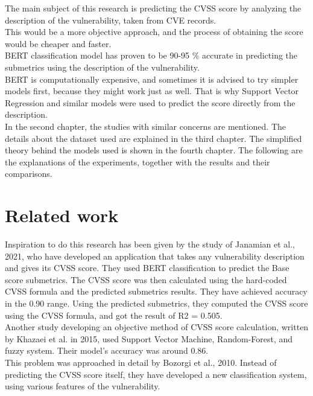 \documentclass[times, utf8, zavrsni, english]{fer}
\begin{document}
\noindent The main subject of this research is predicting the CVSS score by analyzing the description of the vulnerability, taken from CVE records. \\
This would be a more objective approach, and the process of obtaining the score would be cheaper and faster. \\
BERT classification model has proven to be 90-95 \% accurate in predicting the submetrics using the description of the vulnerability. \\
BERT is computationally expensive, and sometimes it is advised to try simpler models first, because they might work just as well. That is why Support Vector Regression and similar models were used to predict the score directly from the description.\\

\noindent In the second chapter, the studies with similar concerns are mentioned. The details about the dataset used are explained in the third chapter. The simplified theory behind the models used is shown in the fourth chapter. The following are the explanations of the experiments, together with the results and their comparisons. 

\chapter{Related work}
Inspiration to do this research has been given by the study of Janamian et al., 2021, who have developed an application that takes any vulnerability description and gives its CVSS score. They used BERT classification to predict the Base score submetrics. The CVSS score was then calculated using the hard-coded CVSS formula and the predicted submetrics results. They have achieved accuracy in the 0.90 range. Using the predicted submetrics, they computed the CVSS score using the CVSS formula, and got the result of R2 = 0.505.\\

\noindent Another study developing an objective method of CVSS score calculation, written by Khazaei et al. in 2015, used Support Vector Machine, Random-Forest, and fuzzy system. Their model's accuracy was around 0.86. \\

\noindent This problem was approached in detail by Bozorgi et al., 2010.  Instead of predicting the CVSS score itself, they have developed a new classification system, using various features of the vulnerability. \\
\end{document}
